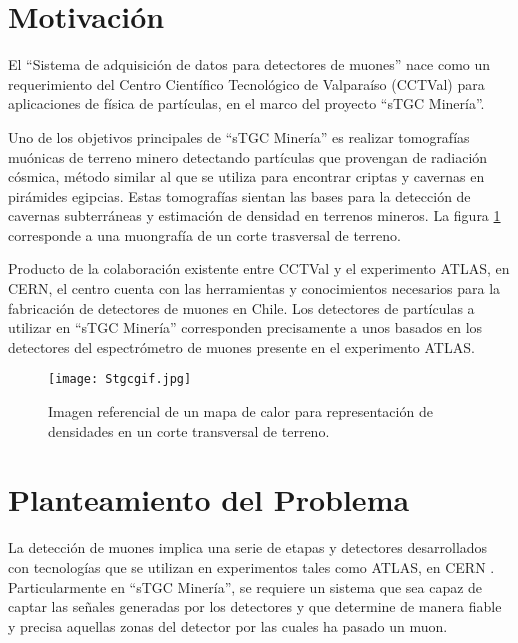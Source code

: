 	
\section{Motivación}
	El ``Sistema de adquisición de datos para detectores de muones'' nace como un requerimiento del Centro Científico Tecnológico de Valparaíso (CCTVal) para aplicaciones de física de partículas, en el marco del proyecto ``sTGC Minería''. 
	
	Uno de los objetivos principales de ``sTGC Minería'' es realizar tomografías muónicas de terreno minero detectando partículas que provengan de radiación cósmica, método similar al que se utiliza para encontrar criptas y cavernas en pirámides egipcias. Estas tomografías sientan las bases para la detección de cavernas subterráneas y estimación de densidad en terrenos mineros. La figura \ref{img:muongrafia} corresponde a una muongrafía de un corte trasversal de terreno. 

	
	Producto de la colaboración existente entre CCTVal y el experimento ATLAS, en CERN, el centro cuenta con las herramientas y conocimientos necesarios para la fabricación de detectores de muones en Chile. Los detectores de partículas a utilizar en ``sTGC Minería'' corresponden precisamente a unos basados en los detectores del espectrómetro de muones presente en el experimento ATLAS.
	
	\begin{figure}[h]
		\centering
		\texttt{[image: Stgcgif.jpg]}
		\caption{Imagen referencial de un mapa de calor para representación de densidades en un corte transversal de terreno.}
		\label{img:muongrafia}
	\end{figure}
	

\section{Planteamiento del Problema}
\label{sec:planteamiento}
	La detección de muones implica una serie de etapas y detectores desarrollados con tecnologías que se utilizan en experimentos tales como ATLAS, en CERN . Particularmente en ``sTGC Minería'', se requiere un sistema que sea capaz de captar las señales generadas por los detectores y que determine de manera fiable y precisa  aquellas zonas del detector por las cuales ha pasado un muon.
	
